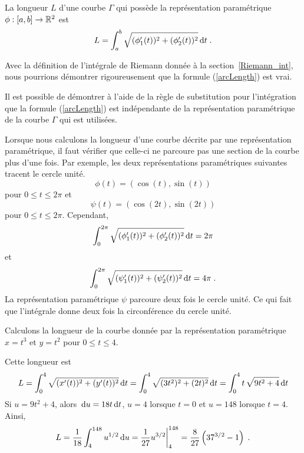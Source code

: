 {\begin{focus}{\prp}
La longueur $L$ d'une courbe $\Gamma$ qui possède la représentation
paramétrique $\phi:[a,b]\rightarrow \mathbb{R}^2$ est
\begin{equation}\label{arcLength}
L = \int_a^b \sqrt{ (\phi_1'(t))^2 + (\phi_2'(t))^2} \,\mathrm{d}t \; .
\end{equation}
\end{focus}

\begin{rmk}[\theory]
Avec la définition de l'intégrale de Riemann
donnée à la section~\ref{Riemann_int}, nous pourrions démontrer
rigoureusement que la formule (\ref{arcLength}) est vrai.
\end{rmk}

Il est possible de démontrer à l'aide de la règle de substitution pour
l'intégration que la formule (\ref{arcLength}) est indépendante de la
représentation paramétrique de la courbe $\Gamma$ qui est utilisées.

\begin{rmk}
Lorsque nous calculons la longueur d'une courbe décrite par une
représentation paramétrique, il faut vérifier que celle-ci ne parcoure
pas une section de la courbe plus d'une fois.  Par exemple, les deux
représentations paramétriques suivantes tracent le cercle unité.
\[
  \phi(t) = \left( \cos(t) , \sin(t) \right)
\]
pour $0\leq t \leq 2\pi$ et
\[
  \psi(t) = \left( \cos(2t) , \sin(2t) \right)
\]
pour $0\leq t \leq 2\pi$.  Cependant,
\[
\int_0^{2\pi} \sqrt{ (\phi_1'(t))^2 + (\phi_2'(t))^2} \,\mathrm{d}t = 2\pi
\]
et
\[
\int_0^{2\pi} \sqrt{ (\psi_1'(t))^2 + (\psi_2'(t))^2} \,\mathrm{d}t = 4\pi
\; .
\]
La représentation paramétrique $\psi$ parcoure deux fois le cercle
unité.  Ce qui fait que l'intégrale donne deux fois la circonférence
du cercle unité.
\end{rmk}

\begin{egg}
Calculons la longueur de la courbe donnée par la représentation
paramétrique $x=t^3$ et $y=t^2$ pour $0\leq t \leq 4$.

Cette longueur est
\[
L = \int_0^4 \sqrt{ (x'(t))^2 + (y'(t))^2} \,\mathrm{d}t
= \int_0^4 \sqrt{ (3t^2)^2 + (2t)^2} \,\mathrm{d}t
= \int_0^4 t\, \sqrt{ 9t^2 + 4} \,\mathrm{d}t
\]
Si $u = 9t^2 + 4$, alors $\,\mathrm{d}u = 18 t \,\mathrm{d}t$, $u=4$ lorsque
$t=0$ et $u=148$ lorsque $t=4$.  Ainsi, 
\[
L = \frac{1}{18} \int_4^{148} u^{1/2} \,\mathrm{d}u
= \frac{1}{27} u^{3/2} \bigg|_4^{148} =
\frac{8}{27} \left( 37^{3/2} - 1 \right) \; .
\]
\end{egg}

}
